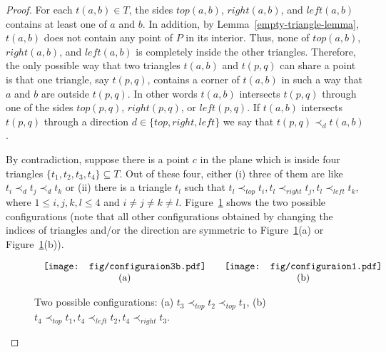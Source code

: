 \documentclass[11pt,a4paper]{article}
\begin{document}
\begin{proof}
For each $t(a,b)\in T$, the sides $top(a,b)$, $right(a,b)$, and $left(a,b)$ contains at least one of $a$ and $b$. In addition, by Lemma~\ref{empty-triangle-lemma}, $t(a,b)$ does not contain any point of $P$ in its interior. Thus, none of $top(a,b)$, $right(a,b)$, and $left(a,b)$ is completely inside the other triangles. Therefore, the only possible way that two triangles $t(a,b)$ and $t(p,q)$ can share a point is that one triangle, say $t(p,q)$, contains a corner of $t(a,b)$ in such a way that $a$ and $b$ are outside $t(p,q)$. In other words $t(a,b)$ intersects $t(p,q)$ through one of the sides $top(p,q)$, $right(p,q)$, or $left(p,q)$. If $t(a,b)$ intersects $t(p,q)$ through a direction $d\in \{top, right, left\}$ we say that $t(p,q)\prec_{d} t(a,b)$. 

By contradiction, suppose there is a point $c$ in the plane which is inside four triangles $\{t_1,t_2,t_3,t_4\}\subseteq T$. Out of these four, either (i) three of them are like $t_i\prec_d t_j \prec_d t_k$ or (ii) there is a triangle $t_l$ such that $t_l\prec_{top} t_i, t_l\prec_{right} t_j, t_l\prec_{left} t_k$, where $1\le i,j, k,l\le 4$ and $i\neq j \neq k \neq l$. Figure~\ref{configuration-fig} shows the two possible configurations (note that all other configurations obtained by changing the indices of triangles and/or the direction are symmetric to Figure~\ref{configuration-fig}(a) or Figure~\ref{configuration-fig}(b)).
\begin{figure}[htb]
  \centering
\setlength{\tabcolsep}{0in}
  $\begin{tabular}{cc}
 \multicolumn{1}{m{.5\columnwidth}}{\centering\texttt{[image: fig/configuraion3b.pdf]}}
&\multicolumn{1}{m{.5\columnwidth}}{\centering\texttt{[image: fig/configuraion1.pdf]}}\\
(a) & (b)
\end{tabular}$
  \caption{Two possible configurations: (a) $t_3 \prec_{top} t_2 \prec_{top} t_1$, (b) $t_4\prec_{top} t_1, t_4\prec_{left} t_2, t_4\prec_{right} t_3$.}
\label{configuration-fig}
\end{figure}


\end{proof}
\end{document}
